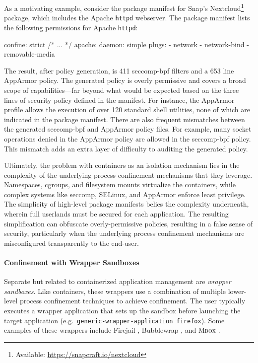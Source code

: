 \documentclass[dvipsnames, 12pt]{article}
\newcommand{\kimmbox}{\textsc{Mbox}}
\begin{document}
As a motivating example, consider the package manifest for Snap's
Nextcloud\footnote{Available: \url{https://snapcraft.io/nextcloud}} package,
which includes the Apache \texttt{httpd} webserver. The package manifest lists
the following permissions for Apache \texttt{httpd}:

\begin{listing}[language=yaml]
confine: strict
/* ... */
apache:
  daemon: simple
  plugs:
  - network
  - network-bind
  - removable-media
\end{listing}

The result, after policy generation, is 411 seccomp-bpf filters and a 653 line
AppArmor policy. The generated policy is overly permissive and covers a broad
scope of capabilities---far beyond what would be expected based on the three
lines of security policy defined in the manifest. For instance, the AppArmor
profile allows the execution of over 120 standard shell utilities, none of which
are indicated in the package manifest. There are also frequent mismatches
between the generated seccomp-bpf and AppArmor policy files. For example, many
socket operations denied in the AppArmor policy are allowed in the seccomp-bpf
policy. This mismatch adds an extra layer of difficulty to auditing the
generated policy.

Ultimately, the problem with containers as an isolation mechanism lies in the
complexity of the underlying process confinement mechanisms that they leverage.
Namespaces, cgroups, and filesystem mounts virtualize the containers, while
complex systems like seccomp, SELinux, and AppArmor enforce least privilege. The
simplicity of high-level package manifests belies the complexity underneath,
wherein full userlands must be secured for each application. The resulting
simplification can obfuscate overly-permissive policies, resulting in a false
sense of security, particularly when the underlying process confinement
mechanisms are misconfigured transparently to the end-user.

\paragraph*{Confinement with Wrapper Sandboxes}

Separate but related to containerized application management are \textit{wrapper
sandboxes}. Like containers, these wrappers use a combination of multiple
lower-level process confinement techniques to achieve confinement.  The user
typically executes a wrapper application that sets up the sandbox before
launching the target application (e.g.~\texttt{generic-wrapper-application
firefox}).  Some examples of these wrappers include Firejail \cite{firejail},
Bubblewrap \cite{bubblewrap}, and \kimmbox{} \cite{kim2013_mbox}.
\end{document}
